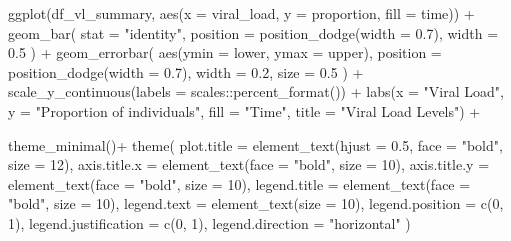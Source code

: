 \documentclass[
  letterpaper,
  DIV=11,
  numbers=noendperiod]{scrartcl}
\newenvironment{Shaded}{\begin{snugshade}}{\end{snugshade}}
\newcommand{\AttributeTok}[1]{\textcolor[rgb]{0.40,0.45,0.13}{#1}}
\newcommand{\DecValTok}[1]{\textcolor[rgb]{0.68,0.00,0.00}{#1}}
\newcommand{\FloatTok}[1]{\textcolor[rgb]{0.68,0.00,0.00}{#1}}
\newcommand{\FunctionTok}[1]{\textcolor[rgb]{0.28,0.35,0.67}{#1}}
\newcommand{\NormalTok}[1]{\textcolor[rgb]{0.00,0.23,0.31}{#1}}
\newcommand{\SpecialCharTok}[1]{\textcolor[rgb]{0.37,0.37,0.37}{#1}}
\newcommand{\StringTok}[1]{\textcolor[rgb]{0.13,0.47,0.30}{#1}}
\begin{document}
\begin{Shaded}
\begin{Highlighting}[]
\FunctionTok{ggplot}\NormalTok{(df\_vl\_summary, }\FunctionTok{aes}\NormalTok{(}\AttributeTok{x =}\NormalTok{ viral\_load, }\AttributeTok{y =}\NormalTok{ proportion, }\AttributeTok{fill =}\NormalTok{ time)) }\SpecialCharTok{+}
  \FunctionTok{geom\_bar}\NormalTok{(}
    \AttributeTok{stat =} \StringTok{"identity"}\NormalTok{,}
    \AttributeTok{position =} \FunctionTok{position\_dodge}\NormalTok{(}\AttributeTok{width =} \FloatTok{0.7}\NormalTok{),}
    \AttributeTok{width =} \FloatTok{0.5}
\NormalTok{  ) }\SpecialCharTok{+}
  \FunctionTok{geom\_errorbar}\NormalTok{(}
    \FunctionTok{aes}\NormalTok{(}\AttributeTok{ymin =}\NormalTok{ lower, }\AttributeTok{ymax =}\NormalTok{ upper),}
    \AttributeTok{position =} \FunctionTok{position\_dodge}\NormalTok{(}\AttributeTok{width =} \FloatTok{0.7}\NormalTok{),}
    \AttributeTok{width =} \FloatTok{0.2}\NormalTok{,}
    \AttributeTok{size =} \FloatTok{0.5}
\NormalTok{  ) }\SpecialCharTok{+}
  \FunctionTok{scale\_y\_continuous}\NormalTok{(}\AttributeTok{labels =}\NormalTok{ scales}\SpecialCharTok{::}\FunctionTok{percent\_format}\NormalTok{()) }\SpecialCharTok{+}
  \FunctionTok{labs}\NormalTok{(}\AttributeTok{x =} \StringTok{"Viral Load"}\NormalTok{, }
       \AttributeTok{y =} \StringTok{"Proportion of individuals"}\NormalTok{, }
       \AttributeTok{fill =} \StringTok{"Time"}\NormalTok{,}
       \AttributeTok{title =} \StringTok{"Viral Load Levels"}\NormalTok{) }\SpecialCharTok{+}
  
  \FunctionTok{theme\_minimal}\NormalTok{()}\SpecialCharTok{+}
  \FunctionTok{theme}\NormalTok{(}
    \AttributeTok{plot.title =} \FunctionTok{element\_text}\NormalTok{(}\AttributeTok{hjust =} \FloatTok{0.5}\NormalTok{, }\AttributeTok{face =} \StringTok{"bold"}\NormalTok{, }\AttributeTok{size =} \DecValTok{12}\NormalTok{),}
    \AttributeTok{axis.title.x =} \FunctionTok{element\_text}\NormalTok{(}\AttributeTok{face =} \StringTok{"bold"}\NormalTok{, }\AttributeTok{size =} \DecValTok{10}\NormalTok{),}
    \AttributeTok{axis.title.y =} \FunctionTok{element\_text}\NormalTok{(}\AttributeTok{face =} \StringTok{"bold"}\NormalTok{, }\AttributeTok{size =} \DecValTok{10}\NormalTok{),}
    \AttributeTok{legend.title =} \FunctionTok{element\_text}\NormalTok{(}\AttributeTok{face =} \StringTok{"bold"}\NormalTok{, }\AttributeTok{size =} \DecValTok{10}\NormalTok{),}
    \AttributeTok{legend.text =} \FunctionTok{element\_text}\NormalTok{(}\AttributeTok{size =} \DecValTok{10}\NormalTok{),}
    \AttributeTok{legend.position =} \FunctionTok{c}\NormalTok{(}\DecValTok{0}\NormalTok{, }\DecValTok{1}\NormalTok{),}
    \AttributeTok{legend.justification =} \FunctionTok{c}\NormalTok{(}\DecValTok{0}\NormalTok{, }\DecValTok{1}\NormalTok{),}
    \AttributeTok{legend.direction =} \StringTok{"horizontal"}
\NormalTok{  )}
\end{Highlighting}
\end{Shaded}
\end{document}
